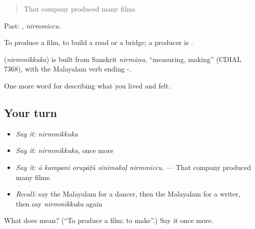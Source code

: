 \begin{quote}
That company produced many films.
\end{quote}

Past: , \emph{nirmmiccu}.

To produce a film, to build a road or a bridge; a producer is .

\begin{cousinweb}
\textbf{} (\emph{nirmmikkuka}) is built from Sanskrit \emph{nirmāṇa}, \textquotedblleft{}measuring, making\textquotedblright{} (CDIAL 7368), with the Malayalam verb ending -.
\end{cousinweb}

\begin{grammarlens}[title={What you've built}]
One more word for describing what you lived and felt.
\end{grammarlens}

\subsection*{Your turn}
\begin{itemize}
\raggedright
  \item \emph{Say it:} \emph{nirmmikkuka}
  \item \emph{Say it:} \emph{nirmmikkuka}, once more
  \item \emph{Say it:} \emph{ā kampani orupāṭŭ sinimakaḷ nirmmiccu.} — That company produced many films.
  \item \emph{Recall:} say the Malayalam for a dancer, then the Malayalam for a writer, then say \emph{nirmmikkuka} again
\end{itemize}

\begin{tcolorbox}[breakable,colback=teal!4,colframe=teal!35!black,title={Before you move on}]
What does  mean? (\textquotedblleft{}To produce a film; to make\textquotedblright{}.) Say it once more.
\end{tcolorbox}
